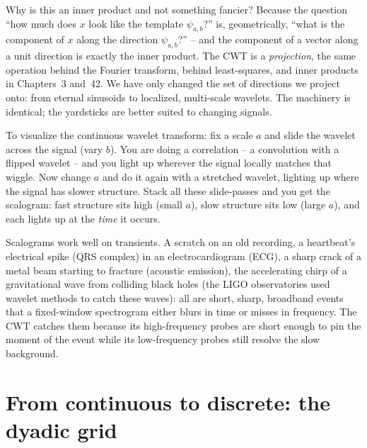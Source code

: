 \begin{whybox}
Why is this an inner product and not something fancier? Because the question ``how
much does $x$ look like the template $\psi_{a,b}$?'' is, geometrically, ``what is
the component of $x$ along the direction $\psi_{a,b}$?'' -- and the component of a
vector along a unit direction is exactly the inner product. The CWT is a
\emph{projection}, the same operation behind the Fourier transform, behind
least-squares, and inner products in Chapters~3 and~42. We have only
changed the set of directions we project onto: from eternal sinusoids to
localized, multi-scale wavelets. The machinery is identical; the yardsticks are
better suited to changing signals.
\end{whybox}

\begin{intuitionbox}
To visualize the continuous wavelet transform: fix a scale $a$ and slide the wavelet across the signal
(vary $b$). You are doing a correlation -- a convolution with a flipped wavelet --
and you light up wherever the signal locally matches that wiggle. Now change $a$
and do it again with a stretched wavelet, lighting up where the signal has slower
structure. Stack all these slide-passes and you get the scalogram: fast structure
sits high (small $a$), slow structure sits low (large $a$), and each lights up at
the \emph{time} it occurs.
\end{intuitionbox}

\begin{applicationbox}
Scalograms work well on transients. A scratch on an old recording, a heartbeat's electrical spike (QRS complex) in an electrocardiogram (ECG), a sharp crack of a metal beam starting to fracture (acoustic emission), the accelerating chirp
of a gravitational wave from colliding black holes (the LIGO observatories used wavelet methods to catch these waves): all are short, sharp, broadband events that a fixed-window
spectrogram either blurs in time or misses in frequency. The CWT catches them
because its high-frequency probes are short enough to pin the moment of the event
while its low-frequency probes still resolve the slow background.
\end{applicationbox}

\section{From continuous to discrete: the dyadic grid}
\label{ch24:dyadic}


